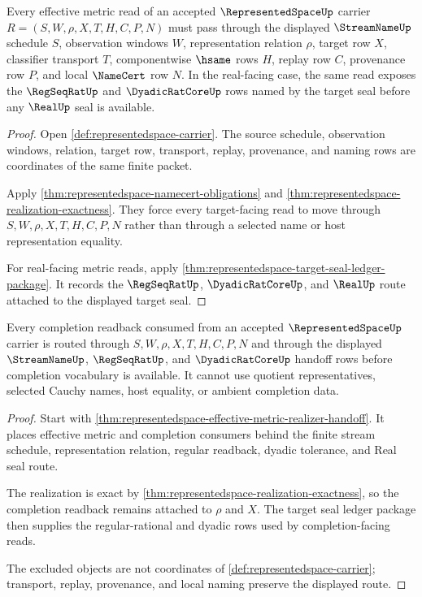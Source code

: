 \begin{theorem}
\label{thm:representedspace-root-effective-metric-obligations}
Every effective metric read of an accepted $\RepresentedSpaceUp$ carrier $R=(S,W,\rho,X,T,H,C,P,N)$ must pass through the displayed $\StreamNameUp$ schedule $S$, observation windows $W$, representation relation $\rho$, target row $X$, classifier transport $T$, componentwise $\hsame$ rows $H$, replay row $C$, provenance row $P$, and local $\NameCert$ row $N$. In the real-facing case, the same read exposes the $\RegSeqRatUp$ and $\DyadicRatCoreUp$ rows named by the target seal before any $\RealUp$ seal is available.
\end{theorem}
\begin{proof}
Open \autoref{def:representedspace-carrier}. The source schedule, observation windows, relation, target row, transport, replay, provenance, and naming rows are coordinates of the same finite packet.

Apply \autoref{thm:representedspace-namecert-obligations} and \autoref{thm:representedspace-realization-exactness}. They force every target-facing read to move through $S,W,\rho,X,T,H,C,P,N$ rather than through a selected name or host representation equality.

For real-facing metric reads, apply \autoref{thm:representedspace-target-seal-ledger-package}. It records the $\RegSeqRatUp$, $\DyadicRatCoreUp$, and $\RealUp$ route attached to the displayed target seal.
\end{proof}

\begin{theorem}
\label{thm:representedspace-root-completion-readback-obligations}
Every completion readback consumed from an accepted $\RepresentedSpaceUp$ carrier is routed through $S,W,\rho,X,T,H,C,P,N$ and through the displayed $\StreamNameUp$, $\RegSeqRatUp$, and $\DyadicRatCoreUp$ handoff rows before completion vocabulary is available. It cannot use quotient representatives, selected Cauchy names, host equality, or ambient completion data.
\end{theorem}
\begin{proof}
Start with \autoref{thm:representedspace-effective-metric-realizer-handoff}. It places effective metric and completion consumers behind the finite stream schedule, representation relation, regular readback, dyadic tolerance, and Real seal route.

The realization is exact by \autoref{thm:representedspace-realization-exactness}, so the completion readback remains attached to $\rho$ and $X$. The target seal ledger package then supplies the regular-rational and dyadic rows used by completion-facing reads.

The excluded objects are not coordinates of \autoref{def:representedspace-carrier}; transport, replay, provenance, and local naming preserve the displayed route.
\end{proof}

